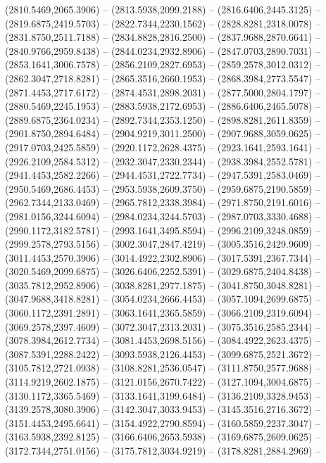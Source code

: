 \begin{scope}[y=0.80pt, x=0.80pt, yscale=-1.000000, xscale=1.000000, inner sep=0pt, outer sep=0pt]
    (2810.5469,2065.3906) -- (2813.5938,2099.2188) -- (2816.6406,2445.3125) --
    (2819.6875,2419.5703) -- (2822.7344,2230.1562) -- (2828.8281,2318.0078) --
    (2831.8750,2511.7188) -- (2834.8828,2816.2500) -- (2837.9688,2870.6641) --
    (2840.9766,2959.8438) -- (2844.0234,2932.8906) -- (2847.0703,2890.7031) --
    (2853.1641,3006.7578) -- (2856.2109,2827.6953) -- (2859.2578,3012.0312) --
    (2862.3047,2718.8281) -- (2865.3516,2660.1953) -- (2868.3984,2773.5547) --
    (2871.4453,2717.6172) -- (2874.4531,2898.2031) -- (2877.5000,2804.1797) --
    (2880.5469,2245.1953) -- (2883.5938,2172.6953) -- (2886.6406,2465.5078) --
    (2889.6875,2364.0234) -- (2892.7344,2353.1250) -- (2898.8281,2611.8359) --
    (2901.8750,2894.6484) -- (2904.9219,3011.2500) -- (2907.9688,3059.0625) --
    (2917.0703,2425.5859) -- (2920.1172,2628.4375) -- (2923.1641,2593.1641) --
    (2926.2109,2584.5312) -- (2932.3047,2330.2344) -- (2938.3984,2552.5781) --
    (2941.4453,2582.2266) -- (2944.4531,2722.7734) -- (2947.5391,2583.0469) --
    (2950.5469,2686.4453) -- (2953.5938,2609.3750) -- (2959.6875,2190.5859) --
    (2962.7344,2133.0469) -- (2965.7812,2338.3984) -- (2971.8750,2191.6016) --
    (2981.0156,3244.6094) -- (2984.0234,3244.5703) -- (2987.0703,3330.4688) --
    (2990.1172,3182.5781) -- (2993.1641,3495.8594) -- (2996.2109,3248.0859) --
    (2999.2578,2793.5156) -- (3002.3047,2847.4219) -- (3005.3516,2429.9609) --
    (3011.4453,2570.3906) -- (3014.4922,2302.8906) -- (3017.5391,2367.7344) --
    (3020.5469,2099.6875) -- (3026.6406,2252.5391) -- (3029.6875,2404.8438) --
    (3035.7812,2952.8906) -- (3038.8281,2977.1875) -- (3041.8750,3048.8281) --
    (3047.9688,3418.8281) -- (3054.0234,2666.4453) -- (3057.1094,2699.6875) --
    (3060.1172,2391.2891) -- (3063.1641,2365.5859) -- (3066.2109,2319.6094) --
    (3069.2578,2397.4609) -- (3072.3047,2313.2031) -- (3075.3516,2585.2344) --
    (3078.3984,2612.7734) -- (3081.4453,2698.5156) -- (3084.4922,2623.4375) --
    (3087.5391,2288.2422) -- (3093.5938,2126.4453) -- (3099.6875,2521.3672) --
    (3105.7812,2721.0938) -- (3108.8281,2536.0547) -- (3111.8750,2577.9688) --
    (3114.9219,2602.1875) -- (3121.0156,2670.7422) -- (3127.1094,3004.6875) --
    (3130.1172,3365.5469) -- (3133.1641,3199.6484) -- (3136.2109,3328.9453) --
    (3139.2578,3080.3906) -- (3142.3047,3033.9453) -- (3145.3516,2716.3672) --
    (3151.4453,2495.6641) -- (3154.4922,2790.8594) -- (3160.5859,2237.3047) --
    (3163.5938,2392.8125) -- (3166.6406,2653.5938) -- (3169.6875,2609.0625) --
    (3172.7344,2751.0156) -- (3175.7812,3034.9219) -- (3178.8281,2884.2969) --

\end{scope}
